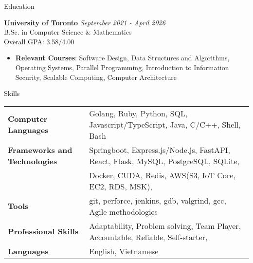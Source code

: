 \documentclass[
	11pt, %
]{resume} %
\begin{document}

\begin{rSection}{Education}
	
	\textbf{University of Toronto} \hfill \textit{September 2021 - April 2026} \\ 
	B.Sc. in Computer Science \& Mathematics \\
	Overall GPA: 3.58/4.00 
	
	\begin{itemize}
		\item \textbf{Relevant Courses}: Software Design, Data Structures and Algorithms, Operating Systems, Parallel Programming, Introduction to Information Security, Scalable Computing, Computer Architecture
	\end{itemize}
\end{rSection}

\begin{rSection}{Skills}
	\begin{tabular}{@{} >{\bfseries}l @{\hspace{6ex}} l @{}}
		Computer Languages & Golang, Ruby, Python, SQL, Javascript/TypeScript, Java, C/C++, Shell, Bash \\

		Frameworks and Technologies & Springboot, Express.js/Node.js, FastAPI, React, Flask,  MySQL, PostgreSQL, SQLite, \\ 
																& Docker, CUDA, Redis, AWS(S3, IoT Core, EC2, RDS, MSK),\\

		Tools & git, perforce, jenkins, gdb, valgrind, gcc, Agile methodologies\\
		Professional Skills & Adaptability, Problem solving, Team Player, Accountable, Reliable, Self-starter, \\
		Languages & English, Vietnamese
	\end{tabular}

\end{rSection}
\end{document}
